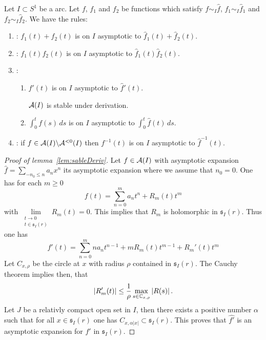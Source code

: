 \begin{rem}
  Let $I\subset S^1$ be a arc.
  Let $f$, $f_1$ and $f_2$ be functions which satisfy $f\sim_I\hat f$,
  $f_1\sim_I\hat f_1$ and $f_2\sim_I\hat f_2$.
  We have the rules:
  \begin{enumerate}
    \item \cite[4.5.Thm.13]{Balser2000Formal}:
      $f_1(t)+f_2(t)$ is on $I$ asymptotic to $\hat f_1(t)+\hat f_2(t)$.
    \item \cite[4.5.Thm.14]{Balser2000Formal}:
      $f_1(t)f_2(t)$ is on $I$ asymptotic to $\hat f_1(t)\hat f_2(t)$.
    \item \cite[4.5.Thm.20]{Balser2000Formal}:
      \begin{enumerate}
        \item $f'(t)$ is on $I$ asymptotic to $\hat f'(t)$.
          \begin{s-lem} \label{lem:sableDeriv}
            $\mathcal{A}(I)$ is stable under derivation.
          \end{s-lem}
        \item $\int_0^tf(s)\,ds$ is on $I$ asymptotic to $\int_0^t\hat f(t)\,ds$.
      \end{enumerate}
    \item \cite[4.5.Thm.21]{Balser2000Formal}:
      if $f\in\mathcal{A}(I)\backslash\mathcal{A}^{<0}(I)$ then
      $f^{-1}(t)$ is on $I$ asymptotic to $\hat f^{-1}(t)$.
  \end{enumerate}
\end{rem}
\begin{proof}[Proof of lemma~\ref{lem:sableDeriv}]
  Let $f\in\mathcal{A}(I)$ with asymptotic expansion $\hat f=\sum_{-n_0\leq n}a_nx^n$
  its asymptotic expansion where we assume that $n_0=0$.
  One has for each $m\geq0$
  \[
    f(t)=\sum_{n=0}^ma_nt^n+R_m(t)t^m
  \]
  with $\underset{\substack{t\to0\\t\in\mathfrak{s}_I(r)}}{\lim}R_m(t)=0$.
  This implies that $R_m$ is holomorphic in $\mathfrak{s}_I(r)$.
  Thus one has
  \[
    f'(t)=\sum_{n=0}^mna_nt^{n-1}+mR_m(t)t^{m-1}+R_m'(t)t^m
  \]
  Let $C_{x,\rho}$ be the circle at $x$ with radius $\rho$ contained in
  $\mathfrak{s}_I(r)$. The Cauchy theorem implies then, that
  \[
    |R_m'(t)|\leq\frac{1}{\rho}\max_{s\in\mathbb{C}_{x,\rho}}|R(s)| \,.
  \]
  Let $J$ be a relativly compact open set in $I$, then there exists a positive
  number $\alpha$ such that for all $x\in\mathfrak{s}_I(r)$ one has
  $C_{x,\alpha|x|}\subset\mathfrak{s}_I(r)$.
  \TODO{}
  This proves that $\hat{f'}$ is an asymptotic expansion for $f'$ in
  $\mathfrak{s}_I(r)$.
\end{proof}


